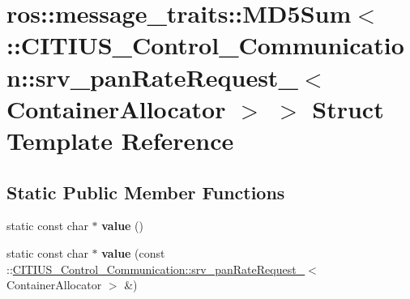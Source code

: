 \hypertarget{structros_1_1message__traits_1_1_m_d5_sum_3_01_1_1_c_i_t_i_u_s___control___communication_1_1srv_f466bd661e7ee9197b4b7130bd97524a}{\section{ros\-:\-:message\-\_\-traits\-:\-:\-M\-D5\-Sum$<$ \-:\-:\-C\-I\-T\-I\-U\-S\-\_\-\-Control\-\_\-\-Communication\-:\-:srv\-\_\-pan\-Rate\-Request\-\_\-$<$ \-Container\-Allocator $>$ $>$ \-Struct \-Template \-Reference}
\label{structros_1_1message__traits_1_1_m_d5_sum_3_01_1_1_c_i_t_i_u_s___control___communication_1_1srv_f466bd661e7ee9197b4b7130bd97524a}
}
\subsection*{\-Static \-Public \-Member \-Functions}
\begin{DoxyCompactItemize}
\item 
\hypertarget{structros_1_1message__traits_1_1_m_d5_sum_3_01_1_1_c_i_t_i_u_s___control___communication_1_1srv_f466bd661e7ee9197b4b7130bd97524a_a2ff880e6b38aa1ea1b5a438ea4070c87}{static const char $\ast$ {\bfseries value} ()}\label{structros_1_1message__traits_1_1_m_d5_sum_3_01_1_1_c_i_t_i_u_s___control___communication_1_1srv_f466bd661e7ee9197b4b7130bd97524a_a2ff880e6b38aa1ea1b5a438ea4070c87}

\item 
\hypertarget{structros_1_1message__traits_1_1_m_d5_sum_3_01_1_1_c_i_t_i_u_s___control___communication_1_1srv_f466bd661e7ee9197b4b7130bd97524a_a768d176bb9f40eebfc744322bf992f8a}{static const char $\ast$ {\bfseries value} (const \-::\hyperlink{struct_c_i_t_i_u_s___control___communication_1_1srv__pan_rate_request__}{\-C\-I\-T\-I\-U\-S\-\_\-\-Control\-\_\-\-Communication\-::srv\-\_\-pan\-Rate\-Request\-\_\-}$<$ \-Container\-Allocator $>$ \&)}\label{structros_1_1message__traits_1_1_m_d5_sum_3_01_1_1_c_i_t_i_u_s___control___communication_1_1srv_f466bd661e7ee9197b4b7130bd97524a_a768d176bb9f40eebfc744322bf992f8a}

\end{DoxyCompactItemize}
